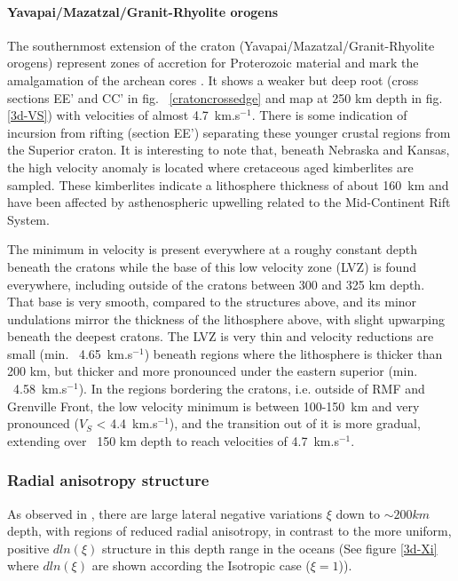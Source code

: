 \documentclass[12pt]{article}
\begin{document}
		\paragraph{Yavapai/Mazatzal/Granit-Rhyolite orogens}
		The southernmost extension of the craton (Yavapai/Mazatzal/Granit-Rhyolite orogens) represent zones of accretion for Proterozoic material and mark the amalgamation of the archean cores \citep{hoffman1988united}. It shows a weaker but deep root (cross sections EE' and CC' in fig. ~\ref{cratoncrossedge} and map at 250 km depth in fig. \ref{3d-VS}) with velocities of almost 4.7~km.s$^{-1}$. There is some indication of incursion from rifting (section EE') separating these younger crustal regions from the Superior craton.	
		It is interesting to note that, beneath Nebraska and Kansas, the high velocity anomaly is located where cretaceous aged kimberlites are sampled. 
		These kimberlites indicate a lithosphere thickness of about 160~km and have been affected by asthenospheric upwelling related to the Mid-Continent Rift System. \citep{griffin2004lithosphere}

		The minimum in velocity is present everywhere at a roughy constant depth beneath the cratons while the base of this low velocity zone (LVZ) is found everywhere, including outside of the cratons between 300 and 325 km depth. That base is very smooth, compared to the structures above, and its minor undulations mirror the thickness of the lithosphere above, with slight upwarping beneath the deepest cratons.
		The LVZ is very thin and velocity reductions are small (min. ~4.65~km.s$^{-1}$) beneath regions where the lithosphere is thicker than 200 km, but thicker and more pronounced under the eastern superior (min. ~4.58~km.s$^{-1}$). In the regions bordering the cratons, i.e. outside of RMF and Grenville Front, the low velocity minimum is between 100-150~km and very pronounced ($V_S$ < 4.4~km.s$^{-1}$), and the transition out of it is more gradual, extending over ~150 km depth to reach velocities of 4.7~km.s$^{-1}$.
	

		\subsubsection{Radial anisotropy structure}
		As observed in \cite{babuvska1998age,gung2003global,yuan2014lithospheric}, there are large lateral negative variations $\xi$ down to $\sim 200km$ depth, with regions of reduced radial anisotropy, in contrast to the more uniform, positive $dln(\xi)$ structure in this depth range in the oceans (See figure \ref{3d-Xi} where $dln(\xi)$ are shown according the Isotropic case ($\xi = 1$)). 
		
\end{document}
